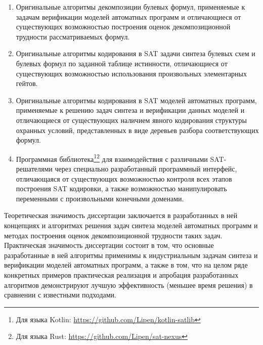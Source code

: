 %
\begin{enumerate}[beginpenalty=10000]
    \item Оригинальные алгоритмы декомпозиции булевых формул, применяемые к задачам верификации моделей автоматных программ и отличающиеся от существующих возможностью построения оценок декомпозиционной трудности рассматриваемых формул.

    \item Оригинальные алгоритмы кодирования в SAT задачи синтеза булевых схем и булевых формул по заданной таблице истинности, отличающиеся от существующих возможностью использования произвольных элементарных гейтов.

    \item Оригинальные алгоритмы кодирования в SAT моделей автоматных программ, применяемые к решению задач синтеза и верификации данных моделей и отличающиеся от существующих наличием явного кодирования структуры охранных условий, представленных в виде деревьев разбора соответствующих формул.

    \item Программная библиотека\footnote{Для языка Kotlin: \url{https://github.com/Lipen/kotlin-satlib}}\footnote{Для языка Rust: \url{https://github.com/Lipen/sat-nexus}} для взаимодействия с различными SAT-решателями через специально разработанный программный интерфейс, отличающаяся от существующих возможностью контроля всех этапов построения SAT кодировки, а также возможностью манипулировать переменными с произвольными конечными доменами.
\end{enumerate}


\influence
%
Теоретическая значимость диссертации заключается в разработанных в ней концепциях и алгоритмах решения задач синтеза моделей автоматных программ и методах построения оценок декомпозиционной трудности таких задач.
Практическая значимость диссертации состоит в том, что основные разработанные в ней алгоритмы применимы к индустриальным задачам синтеза и верификации моделей автоматных программ, а также в том, что на целом ряде конкретных примеров практическая реализация и апробация разработанных алгоритмов демонстрируют лучшую эффективность (меньшее время решения) в сравнении с известными подходами.


